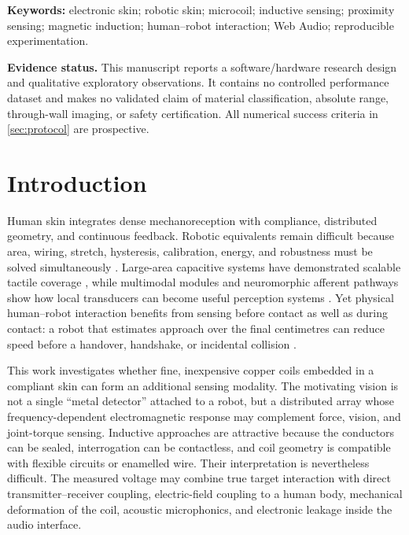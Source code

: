 \documentclass[10pt]{article}
\begin{document}
\noindent\textbf{Keywords:} electronic skin; robotic skin; microcoil; inductive sensing; proximity sensing; magnetic induction; human--robot interaction; Web Audio; reproducible experimentation.

\vspace{0.6em}
\noindent\colorbox{papergray}{\parbox{0.97\linewidth}{\textbf{Evidence status.} This manuscript reports a software/hardware research design and qualitative exploratory observations. It contains no controlled performance dataset and makes no validated claim of material classification, absolute range, through-wall imaging, or safety certification. All numerical success criteria in \cref{sec:protocol} are prospective.}}

\section{Introduction}
Human skin integrates dense mechanoreception with compliance, distributed geometry, and continuous feedback. Robotic equivalents remain difficult because area, wiring, stretch, hysteresis, calibration, energy, and robustness must be solved simultaneously \citep{dahiya2010tactile,hammock2013evolution,chortos2016prosthetic}. Large-area capacitive systems have demonstrated scalable tactile coverage \citep{someya2004large,maiolino2013capacitive}, while multimodal modules and neuromorphic afferent pathways show how local transducers can become useful perception systems \citep{mittendorfer2011humanoid,tee2015mechanoreceptor,kim2018afferent}. Yet physical human--robot interaction benefits from sensing before contact as well as during contact: a robot that estimates approach over the final centimetres can reduce speed before a handover, handshake, or incidental collision \citep{pang2018flexible,fonseca2023hybrid}.

This work investigates whether fine, inexpensive copper coils embedded in a compliant skin can form an additional sensing modality. The motivating vision is not a single ``metal detector'' attached to a robot, but a distributed array whose frequency-dependent electromagnetic response may complement force, vision, and joint-torque sensing. Inductive approaches are attractive because the conductors can be sealed, interrogation can be contactless, and coil geometry is compatible with flexible circuits or enamelled wire. Their interpretation is nevertheless difficult. The measured voltage may combine true target interaction with direct transmitter--receiver coupling, electric-field coupling to a human body, mechanical deformation of the coil, acoustic microphonics, and electronic leakage inside the audio interface.
\end{document}
